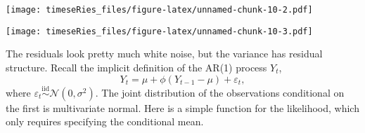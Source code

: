\documentclass[]{book}
\newenvironment{Shaded}{\begin{snugshade}}{\end{snugshade}}
\newcommand{\KeywordTok}[1]{\textcolor[rgb]{0.13,0.29,0.53}{\textbf{#1}}}
\newcommand{\DataTypeTok}[1]{\textcolor[rgb]{0.13,0.29,0.53}{#1}}
\newcommand{\DecValTok}[1]{\textcolor[rgb]{0.00,0.00,0.81}{#1}}
\newcommand{\StringTok}[1]{\textcolor[rgb]{0.31,0.60,0.02}{#1}}
\newcommand{\CommentTok}[1]{\textcolor[rgb]{0.56,0.35,0.01}{\textit{#1}}}
\newcommand{\OperatorTok}[1]{\textcolor[rgb]{0.81,0.36,0.00}{\textbf{#1}}}
\newcommand{\NormalTok}[1]{#1}
\begin{document}
\texttt{[image: timeseRies\_files/figure-latex/unnamed-chunk-10-2.pdf]}

\begin{Shaded}
\end{Shaded}

\texttt{[image: timeseRies\_files/figure-latex/unnamed-chunk-10-3.pdf]}

The residuals look pretty much white noise, but the variance has
residual structure. Recall the implicit definition of the AR(1) process
\(Y_t\), \[Y_t=\mu+\phi(Y_{t-1}-\mu)+\varepsilon_t,\] where
\(\varepsilon_t \stackrel{\mathrm{iid}}{\sim} \mathcal{N}(0,\sigma^2)\).
The joint distribution of the observations conditional on the first is
multivariate normal. Here is a simple function for the likelihood, which
only requires specifying the conditional mean.
\end{document}
